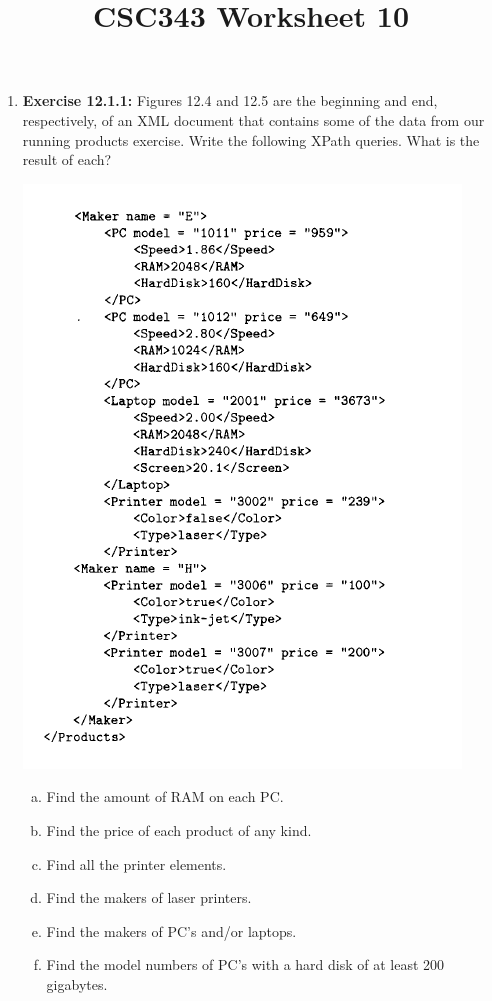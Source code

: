 \documentclass[12pt]{article}
\begin{document}
\title{CSC343 Worksheet 10}
\maketitle

\bigskip

\begin{enumerate}[1.]
    \item \textbf{Exercise 12.1.1:} Figures 12.4 and 12.5 are the beginning and end, respectively,
    of an XML document that contains some of the data from our running
    products exercise. Write the following XPath queries. What is the result of
    each?

    \begin{center}
    \includegraphics[width=0.7\linewidth]{images/worksheet_10_1.png}
    \end{center}

    \bigskip

    \begin{enumerate}[a)]
        \item Find the amount of RAM on each PC.
        \item Find the price of each product of any kind.
        \item Find all the printer elements.
        \item Find the makers of laser printers.
        \item Find the makers of PC's and/or laptops.
        \item Find the model numbers of PC's with a hard disk of at least 200 gigabytes.
    \end{enumerate}


\end{enumerate}
\end{document}
